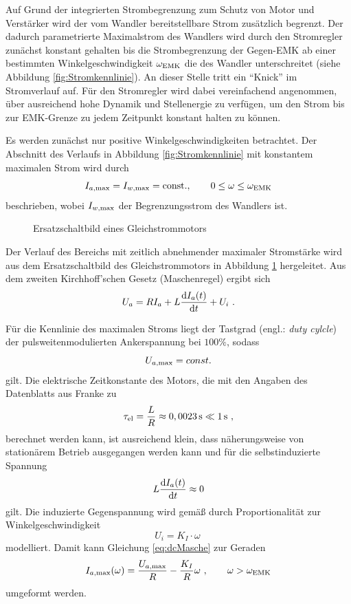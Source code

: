 Auf Grund der integrierten Strombegrenzung zum Schutz von Motor und Verstärker wird der vom Wandler bereitstellbare Strom zusätzlich begrenzt. Der dadurch parametrierte Maximalstrom des Wandlers wird durch den Stromregler zunächst konstant gehalten bis die Strombegrenzung der Gegen-EMK ab einer bestimmten Winkelgeschwindigkeit $\omega_{\mathrm{EMK}}$ die des Wandler unterschreitet (siehe Abbildung \ref{fig:Stromkennlinie}). An dieser Stelle tritt ein "`Knick"' im Stromverlauf auf. Für den Stromregler wird dabei vereinfachend angenommen, über ausreichend hohe Dynamik und Stellenergie zu verfügen, um den Strom bis zur EMK-Grenze zu jedem Zeitpunkt konstant halten zu können.

Es werden zunächst nur positive Winkelgeschwindigkeiten betrachtet. 
Der Abschnitt des Verlaufs in Abbildung \ref{fig:Stromkennlinie} mit konstantem maximalen Strom wird durch
\begin{equation}
	I_{a \mathrm{, max}}  = I_{w\mathrm{, max}} = \mathrm{const.}, \qquad 0 \leq \omega \leq \omega_{\mathrm{EMK}}
	\label{eq:Iconst}
\end{equation}
beschrieben, wobei $I_{w\mathrm{, max}}$ der Begrenzungsstrom des Wandlers ist.

\begin{figure}[h]
	\centering
		
	\caption{Ersatzschaltbild eines Gleichstrommotors}
	\label{fig:dcESB}
\end{figure}

Der Verlauf des Bereichs mit zeitlich abnehmender maximaler Stromstärke wird aus dem Ersatzschaltbild des Gleichstrommotors in Abbildung \ref{fig:dcESB} hergeleitet. Aus dem zweiten Kirchhoff'schen Gesetz (Maschenregel) ergibt sich
\begin{equation}
	U_a =  RI_a + L \frac{\mathrm{d}I_a(t)}{\mathrm{d}t} + U_i \ . 
	\label{eq:dcMasche}
\end{equation}

Für die Kennlinie des maximalen Stroms liegt der Tastgrad (engl.: \textit{duty cylcle}) der pulsweitenmodulierten Ankerspannung bei $100\%$, sodass 
\[
	U_{a \mathrm{, max}}  = const.
\]
gilt. Die elektrische Zeitkonstante des Motors, die mit den Angaben des Datenblatts aus Franke \cite{franke} zu 
\[
	\tau_{\mathrm{el}} = \frac{L}{R} \approx 0,0023\,\mathrm{s} \ll 1\,\mathrm{s} \ ,
\]
berechnet werden kann, ist ausreichend klein, dass näherungsweise von stationärem Betrieb ausgegangen werden kann und für die selbstinduzierte Spannung 
\[
	L \frac{\mathrm{d}I_a(t)}{\mathrm{d}t} \approx 0
\]
gilt. Die induzierte Gegenspannung wird gemäß \cite{binder} durch Proportionalität zur Winkelgeschwindigkeit
\[
	U_i  = K_I \cdot \omega \ 
\]
modelliert.
Damit kann Gleichung \eqref{eq:dcMasche} zur Geraden
\begin{equation}
	I_{a \mathrm{, max}}(\omega) = \frac{U_{a \mathrm{, max}}}{R} - \frac{K_I}{R} \omega \ , \qquad \omega > \omega_{\mathrm{EMK}} 
	\label{eq:Ivar}
\end{equation}
umgeformt werden.

